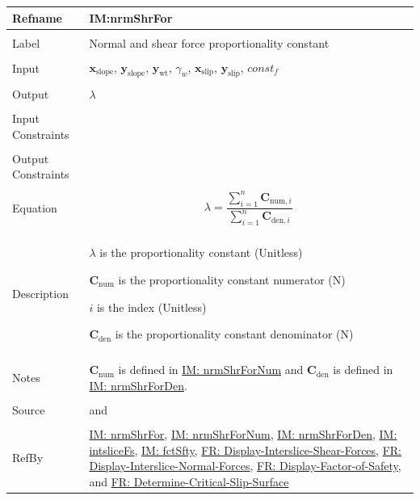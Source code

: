 \documentclass[12pt]{article}
\begin{document}
\noindent \begin{minipage}{\textwidth}
\begin{tabular}{>{\raggedright}p{}>{\raggedright\arraybackslash}p{}}
\toprule \textbf{Refname} & \textbf{IM:nrmShrFor}
\label{IM:nrmShrFor}
\\ \midrule \\
Label & Normal and shear force proportionality constant
\\ \midrule \\
Input & ${\mathbf{x}_{\text{slope}}}$, ${\mathbf{y}_{\text{slope}}}$, ${\mathbf{y}_{\text{wt}}}$, ${γ_{w}}$, ${\mathbf{x}_{\text{slip}}}$, ${\mathbf{y}_{\text{slip}}}$, $const_f$
\\ \midrule \\
Output & $λ$
\\ \midrule \\
Input Constraints & 
\\ \midrule \\
Output Constraints & 
\\ \midrule \\
Equation & \begin{displaymath}
           λ=\frac{\displaystyle\sum_{i=1}^{n}{{\mathbf{C}_{\text{num},i}}}}{\displaystyle\sum_{i=1}^{n}{{\mathbf{C}_{\text{den},i}}}}
           \end{displaymath}
\\ \midrule \\
Description & \begin{symbDescription}
              \item{$λ$ is the proportionality constant (Unitless)}
              \item{${\mathbf{C}_{\text{num}}}$ is the proportionality constant numerator (N)}
              \item{$i$ is the index (Unitless)}
              \item{${\mathbf{C}_{\text{den}}}$ is the proportionality constant denominator (N)}
              \end{symbDescription}
\\ \midrule \\
Notes & ${\mathbf{C}_{\text{num}}}$ is defined in \hyperref[IM:nrmShrForNum]{IM: nrmShrForNum} and ${\mathbf{C}_{\text{den}}}$ is defined in \hyperref[IM:nrmShrForDen]{IM: nrmShrForDen}.
\\ \midrule \\
Source & \cite{chen2005} and \cite{karchewski2012}
\\ \midrule \\
RefBy & \hyperref[IM:nrmShrFor]{IM: nrmShrFor}, \hyperref[IM:nrmShrForNum]{IM: nrmShrForNum}, \hyperref[IM:nrmShrForDen]{IM: nrmShrForDen}, \hyperref[IM:intsliceFs]{IM: intsliceFs}, \hyperref[IM:fctSfty]{IM: fctSfty}, \hyperref[displayShear]{FR: Display-Interslice-Shear-Forces}, \hyperref[displayNormal]{FR: Display-Interslice-Normal-Forces}, \hyperref[displayFS]{FR: Display-Factor-of-Safety}, and \hyperref[determineCritSlip]{FR: Determine-Critical-Slip-Surface}
\\ \bottomrule
\end{tabular}
\end{minipage}
\end{document}
